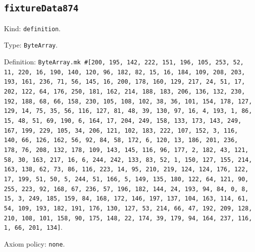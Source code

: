 \documentclass[11pt]{article}
\begin{document}
\subsection*{\texttt{fixtureData874}}
\noindent Kind: \texttt{definition}.\par
\noindent Type: \texttt{ByteArray}.\par
\noindent Definition: \texttt{ByteArray.mk \#[200, 195, 142, 222, 151, 196, 105, 253, 52, 11, 220, 16, 190, 140, 120, 96, 182, 82, 15, 16, 184, 109, 208, 203, 193, 161, 236, 71, 56, 145, 16, 200, 178, 160, 129, 217, 24, 51, 17, 202, 122, 64, 176, 250, 181, 162, 214, 188, 183, 206, 136, 132, 230, 192, 188, 68, 66, 158, 230, 105, 108, 102, 38, 36, 101, 154, 178, 127, 129, 14, 75, 35, 56, 116, 127, 81, 48, 39, 130, 97, 16, 4, 193, 1, 86, 15, 48, 51, 69, 190, 6, 164, 17, 204, 249, 158, 133, 173, 143, 249, 167, 199, 229, 105, 34, 206, 121, 102, 183, 222, 107, 152, 3, 116, 140, 66, 126, 162, 56, 92, 84, 58, 172, 6, 120, 13, 186, 201, 236, 178, 76, 208, 132, 178, 109, 143, 145, 116, 96, 177, 2, 182, 43, 121, 58, 30, 163, 217, 16, 6, 244, 242, 133, 83, 52, 1, 150, 127, 155, 214, 163, 138, 62, 73, 86, 116, 223, 14, 95, 210, 219, 124, 124, 176, 122, 17, 199, 51, 50, 5, 244, 51, 166, 5, 149, 135, 180, 122, 64, 121, 90, 255, 223, 92, 168, 67, 236, 57, 196, 182, 144, 24, 193, 94, 84, 0, 8, 15, 3, 249, 185, 159, 84, 168, 172, 146, 197, 137, 104, 163, 114, 61, 54, 109, 193, 182, 191, 176, 130, 127, 53, 214, 66, 47, 192, 209, 128, 210, 108, 101, 158, 90, 175, 148, 22, 174, 39, 179, 94, 164, 237, 116, 1, 66, 201, 134]}.\par
\noindent Axiom policy: \texttt{none}.\par
\end{document}
